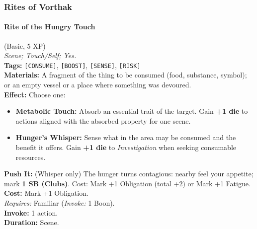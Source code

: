 \subsubsection*{Rites of Vorthak}

\paragraph{Rite of the Hungry Touch} (Basic, 5 XP) \hfill \\
\emph{Scene; Touch/Self; Yes.} \\
\textbf{Tags:} \texttt{[CONSUME]}, \texttt{[BOOST]}, \texttt{[SENSE]}, \texttt{[RISK]} \\
\textbf{Materials:} A fragment of the thing to be consumed (food, substance, symbol); or an empty vessel or a place where something was devoured. \\
\textbf{Effect:} Choose one:
\begin{itemize}
  \item \textbf{Metabolic Touch:} Absorb an essential trait of the target. Gain \textbf{+1 die} to actions aligned with the absorbed property for one scene.
  \item \textbf{Hunger's Whisper:} Sense what in the area may be consumed and the benefit it offers. Gain \textbf{+1 die} to \textit{Investigation} when seeking consumable resources.
\end{itemize}
\textbf{Push It:} (Whisper only) The hunger turns contagious: nearby feel your appetite; mark \textbf{1 SB (Clubs)}. Cost: Mark +1 Obligation (total +2) or Mark +1 Fatigue. \\
\textbf{Cost:} Mark +1 Obligation. \\
\textit{Requires:} Familiar (\textit{Invoke:} 1 Boon). \\
\textbf{Invoke:} 1 action. \\
\textbf{Duration:} Scene.

